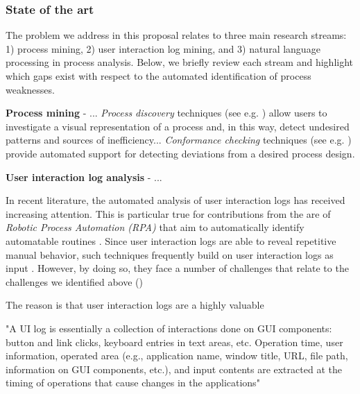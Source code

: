  \subsubsection{State of the art}

The problem we address in this proposal relates to three main research streams: 1) process mining, 2) user interaction log mining, and 3) natural language processing in process analysis. Below, we briefly review each stream and highlight which gaps exist with respect to the automated identification of process weaknesses.  

\textbf{Process mining} - ...  \textit{Process discovery} techniques (see e.g. \cite{gunther2007fuzzy,weijters2011flexible,leemans2013discovering}) allow users to investigate a visual representation of a process and, in this way, detect undesired patterns and sources of inefficiency... \textit{Conformance checking} techniques (see e.g. \cite{rozinat2008conformance,adriansyah2011conformance}) provide automated support for detecting deviations from a desired process design. 



\textbf{User interaction log analysis} - ...

In recent literature, the automated analysis of user interaction logs has received increasing attention. This is particular true for contributions from the are of \textit{Robotic Process Automation (RPA)} that aim to automatically identify automatable routines \cite{}. Since user interaction logs are able to reveal repetitive manual behavior, such techniques frequently build on user interaction logs as input \cite{}. However, by doing so, they face a number of challenges that relate to the challenges we identified above ()  



The reason is that user interaction logs are a highly valuable 

"A UI log is essentially a collection of interactions done on GUI components: button and link clicks, keyboard entries in text areas, etc. Operation time, user information, operated area (e.g., application name, window title, URL, file path, information on GUI components, etc.), and input contents are extracted at the timing of operations that cause changes in the applications" \cite{Urabe21}


